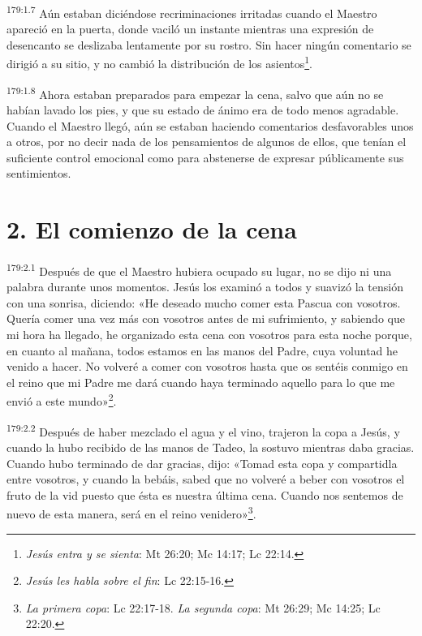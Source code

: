 \par
\textsuperscript{179:1.7} Aún estaban diciéndose recriminaciones irritadas cuando el Maestro apareció en la puerta, donde vaciló un instante mientras una expresión de desencanto se deslizaba lentamente por su rostro. Sin hacer ningún comentario se dirigió a su sitio, y no cambió la distribución de los asientos\footnote{\textit{Jesús entra y se sienta}: Mt 26:20; Mc 14:17; Lc 22:14.}.

\par
\textsuperscript{179:1.8} Ahora estaban preparados para empezar la cena, salvo que aún no se habían lavado los pies, y que su estado de ánimo era de todo menos agradable. Cuando el Maestro llegó, aún se estaban haciendo comentarios desfavorables unos a otros, por no decir nada de los pensamientos de algunos de ellos, que tenían el suficiente control emocional como para abstenerse de expresar públicamente sus sentimientos.

\section*{2. El comienzo de la cena}
\par
\textsuperscript{179:2.1} Después de que el Maestro hubiera ocupado su lugar, no se dijo ni una palabra durante unos momentos. Jesús los examinó a todos y suavizó la tensión con una sonrisa, diciendo: «He deseado mucho comer esta Pascua con vosotros. Quería comer una vez más con vosotros antes de mi sufrimiento, y sabiendo que mi hora ha llegado, he organizado esta cena con vosotros para esta noche porque, en cuanto al mañana, todos estamos en las manos del Padre, cuya voluntad he venido a hacer. No volveré a comer con vosotros hasta que os sentéis conmigo en el reino que mi Padre me dará cuando haya terminado aquello para lo que me envió a este mundo»\footnote{\textit{Jesús les habla sobre el fin}: Lc 22:15-16.}.

\par
\textsuperscript{179:2.2} Después de haber mezclado el agua y el vino, trajeron la copa a Jesús, y cuando la hubo recibido de las manos de Tadeo, la sostuvo mientras daba gracias. Cuando hubo terminado de dar gracias, dijo: «Tomad esta copa y compartidla entre vosotros, y cuando la bebáis, sabed que no volveré a beber con vosotros el fruto de la vid puesto que ésta es nuestra última cena. Cuando nos sentemos de nuevo de esta manera, será en el reino venidero»\footnote{\textit{La primera copa}: Lc 22:17-18. \textit{La segunda copa}: Mt 26:29; Mc 14:25; Lc 22:20.}.

